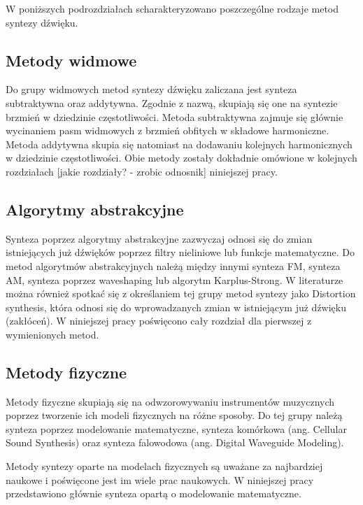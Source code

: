 W poniższych podrozdziałach scharakteryzowano poszczególne rodzaje metod syntezy dźwięku.

\subsection{Metody widmowe}
Do grupy widmowych metod syntezy dźwięku zaliczana jest synteza subtraktywna oraz addytywna. Zgodnie z nazwą, skupiają się one na syntezie brzmień w dziedzinie częstotliwości. Metoda subtraktywna zajmuje się głównie wycinaniem pasm widmowych z brzmień obfitych w składowe harmoniczne. Metoda addytywna skupia się natomiast na dodawaniu kolejnych harmonicznych w dziedzinie częstotliwości. Obie metody zostały dokładnie omówione w kolejnych rozdziałach [jakie rozdziały? - zrobic odnosnik] niniejszej pracy.

\subsection{Algorytmy abstrakcyjne}
Synteza poprzez algorytmy abstrakcyjne zazwyczaj odnosi się do zmian istniejących już dźwięków poprzez filtry nieliniowe lub funkcje matematyczne. Do metod algorytmów abstrakcyjnych należą między innymi synteza FM, synteza AM, synteza poprzez waveshaping lub algorytm Karplus-Strong. W literaturze można również spotkać się z określaniem tej grupy metod syntezy jako Distortion synthesis, która odnosi się do wprowadzanych zmian w istniejącym już dźwięku (zakłóceń). W niniejszej pracy poświęcono cały rozdział dla pierwszej z wymienionych metod.

\subsection{Metody fizyczne}
Metody fizyczne skupiają się na odwzorowywaniu instrumentów muzycznych poprzez tworzenie ich modeli fizycznych na różne sposoby. Do tej grupy należą synteza poprzez modelowanie matematyczne, synteza komórkowa (ang. Cellular Sound Synthesis) oraz synteza falowodowa (ang. Digital Waveguide Modeling).

Metody syntezy oparte na modelach fizycznych są uważane za najbardziej naukowe i poświęcone jest im wiele prac naukowych. W niniejszej pracy przedstawiono głównie synteza opartą o modelowanie matematyczne.

